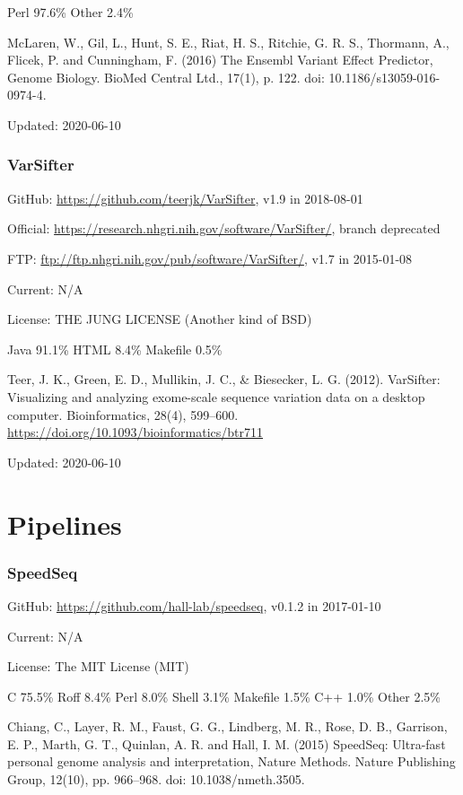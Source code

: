 \documentclass[]{article}
\begin{document}
Perl 97.6\% Other 2.4\%

McLaren, W., Gil, L., Hunt, S. E., Riat, H. S., Ritchie, G. R. S., Thormann, A., Flicek, P. and Cunningham, F. (2016) The Ensembl Variant Effect Predictor, Genome Biology. BioMed Central Ltd., 17(1), p. 122. doi: 10.1186/s13059-016-0974-4.

Updated: 2020-06-10

\section{VarSifter}

GitHub: \url{https://github.com/teerjk/VarSifter}, v1.9 in 2018-08-01

Official: \url{https://research.nhgri.nih.gov/software/VarSifter/}, branch deprecated

FTP: \url{ftp://ftp.nhgri.nih.gov/pub/software/VarSifter/}, v1.7 in 2015-01-08

Current: N/A

License: THE JUNG LICENSE (Another kind of BSD)

Java 91.1\% HTML 8.4\% Makefile 0.5\%

Teer, J. K., Green, E. D., Mullikin, J. C., \& Biesecker, L. G. (2012). VarSifter: Visualizing and analyzing exome-scale sequence variation data on a desktop computer. Bioinformatics, 28(4), 599–600. \url{https://doi.org/10.1093/bioinformatics/btr711}

Updated: 2020-06-10

\part{Pipelines}
\section{SpeedSeq}

GitHub: \url{https://github.com/hall-lab/speedseq}, v0.1.2 in 2017-01-10

Current: N/A

License: The MIT License (MIT)

C 75.5\% Roff 8.4\% Perl 8.0\% Shell 3.1\% Makefile 1.5\% C++ 1.0\% Other 2.5\%

Chiang, C., Layer, R. M., Faust, G. G., Lindberg, M. R., Rose, D. B., Garrison, E. P., Marth, G. T., Quinlan, A. R. and Hall, I. M. (2015) SpeedSeq: Ultra-fast personal genome analysis and interpretation, Nature Methods. Nature Publishing Group, 12(10), pp. 966–968. doi: 10.1038/nmeth.3505.
\end{document}
